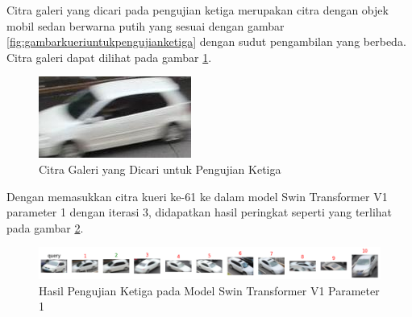 Citra galeri yang dicari pada pengujian ketiga merupakan citra dengan objek mobil sedan berwarna putih 
yang sesuai dengan gambar \ref{fig:gambarkueriuntukpengujianketiga} dengan sudut pengambilan yang berbeda. 
Citra galeri dapat dilihat pada gambar \ref{fig:gambargaleriuntukpengujianketiga}.

\begin{figure}[h!]
  \centering
  \includegraphics[scale=0.4]{gambar/Gal61_1120.jpg}
  \caption{Citra Galeri yang Dicari untuk Pengujian Ketiga}
  \label{fig:gambargaleriuntukpengujianketiga}
\end{figure}

Dengan memasukkan citra kueri ke-61 ke dalam model Swin Transformer V1 parameter 1 dengan iterasi 3, didapatkan hasil 
peringkat seperti yang terlihat pada gambar \ref{fig:hasilpengujianketigapadamodelswintransformerv1param1}.

\begin{figure}[h!]
  \centering
  \includegraphics[scale=0.6]{gambar/Que61V1P1IT3.png}
  \caption{Hasil Pengujian Ketiga pada Model Swin Transformer V1 Parameter 1}
  \label{fig:hasilpengujianketigapadamodelswintransformerv1param1}
\end{figure}

